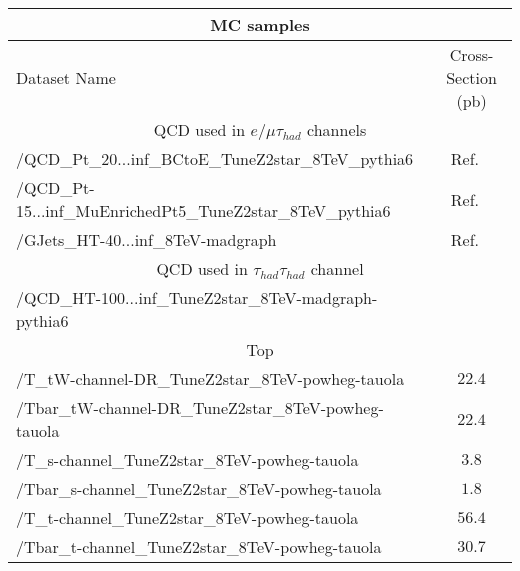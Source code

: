 \begin{table}[!Hhtb]
\begin{center}
\small{
\begin{tabular}{|l|c|}
\hline
\multicolumn{2}{|c|}{MC samples } \\
\hline
Dataset Name                                            & Cross-Section (pb)    \\
\hline
\multicolumn{2}{|c|}{QCD used in $e/\mu\tau_{had}$ channels }\\
\hline
/QCD\_Pt\_20...inf\_BCtoE\_TuneZ2star\_8TeV\_pythia6                & Ref. ~\cite{Prep}\\ 
/QCD\_Pt-15...inf\_MuEnrichedPt5\_TuneZ2star\_8TeV\_pythia6         & Ref. ~\cite{Prep}\\
/GJets\_HT-40...inf\_8TeV-madgraph                                  & Ref. ~\cite{Prep}\\
\hline
\multicolumn{2}{|c|}{QCD used in $\tau_{had}\tau_{had}$ channel }\\
\hline
/QCD\_HT-100...inf\_TuneZ2star\_8TeV-madgraph-pythia6            &\\
\hline

\multicolumn{2}{|c|}{Top }\\
\hline
/T\_tW-channel-DR\_TuneZ2star\_8TeV-powheg-tauola       & $22.4$                \\
/Tbar\_tW-channel-DR\_TuneZ2star\_8TeV-powheg-tauola    & $22.4$\\
/T\_s-channel\_TuneZ2star\_8TeV-powheg-tauola           & $3.8$\\%
/Tbar\_s-channel\_TuneZ2star\_8TeV-powheg-tauola        & $1.8$\\%
/T\_t-channel\_TuneZ2star\_8TeV-powheg-tauola           & $56.4$\\
/Tbar\_t-channel\_TuneZ2star\_8TeV-powheg-tauola        & $30.7$\\


\end{tabular}}
\end{center}
\end{table}
